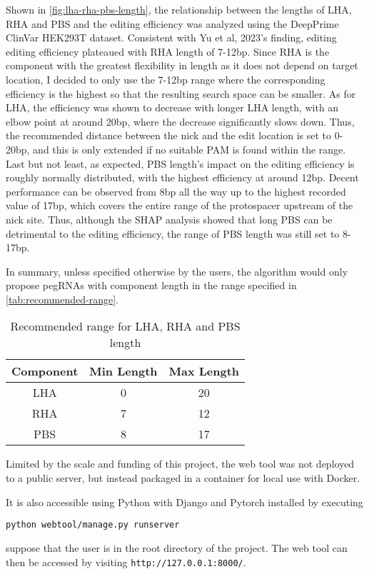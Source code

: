 Shown in \autoref{fig:lha-rha-pbs-length}, the relationship between the lengths of LHA, RHA and PBS and the editing efficiency was analyzed using the DeepPrime ClinVar HEK293T dataset. Consistent with Yu et al, 2023's finding, editing editing efficiency plateaued with RHA length of 7-12bp. Since RHA is the component with the greatest flexibility in length as it does not depend on target location, I decided to only use the 7-12bp range where the corresponding efficiency is the highest so that the resulting search space can be smaller.  As for LHA, the efficiency was shown to decrease with longer LHA length, with an elbow point at around 20bp, where the decrease significantly slows down. Thus, the recommended distance between the nick and the edit location is set to 0-20bp, and this is only extended if no suitable PAM is found within the range. Last but not least, as expected, PBS length's impact on the editing efficiency is roughly normally distributed, with the highest efficiency at around 12bp. Decent performance can be observed from 8bp all the way up to the highest recorded value of 17bp, which covers the entire range of the protospacer upstream of the nick site. Thus, although the SHAP analysis showed that long PBS can be detrimental to the editing efficiency, the range of PBS length was still set to 8-17bp.

In summary, unless specified otherwise by the users, the algorithm would only propose pegRNAs with component length in the range specified in \autoref{tab:recommended-range}.

\begin{table}[h]
    \centering
    \begin{tabular}{c|c|c}
        \textbf{Component} & \textbf{Min Length} & \textbf{Max Length} \\
        \hline
        LHA & 0 & 20 \\
        RHA & 7 & 12 \\
        PBS & 8 & 17 \\
    \end{tabular}
    \caption{Recommended range for LHA, RHA and PBS length}
    \label{tab:recommended-range}
\end{table}


Limited by the scale and funding of this project, the web tool was not deployed to a public server, but instead packaged in a container for local use with Docker. 

It is also accessible using Python with Django and Pytorch installed by executing 

\verb|python webtool/manage.py runserver|

suppose that the user is in the root directory of the project. The web tool can then be accessed by visiting \verb|http://127.0.0.1:8000/|.